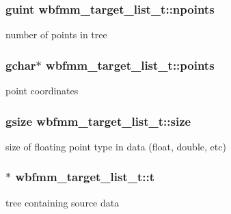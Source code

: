 \subsubsection[{npoints}]{\setlength{\rightskip}{0pt plus 5cm}guint wbfmm\+\_\+target\+\_\+list\+\_\+t\+::npoints}\label{structwbfmm__target__list__t_a0e28c02fe05592065420861ece422658}
number of points in tree 
\subsubsection[{points}]{\setlength{\rightskip}{0pt plus 5cm}gchar$\ast$ wbfmm\+\_\+target\+\_\+list\+\_\+t\+::points}\label{structwbfmm__target__list__t_a506b4f5c246ffeaa63579dd0599f4982}
point coordinates 
\subsubsection[{size}]{\setlength{\rightskip}{0pt plus 5cm}gsize wbfmm\+\_\+target\+\_\+list\+\_\+t\+::size}\label{structwbfmm__target__list__t_a8a3765da21d5bc65aecdb430dba04af0}
size of floating point type in data (float, double, etc) 
\subsubsection[{t}]{$\ast$ wbfmm\+\_\+target\+\_\+list\+\_\+t\+::t}\label{structwbfmm__target__list__t_a329c6de7e15dc5a69c7cb8fa6ee1ae5a}
tree containing source data 